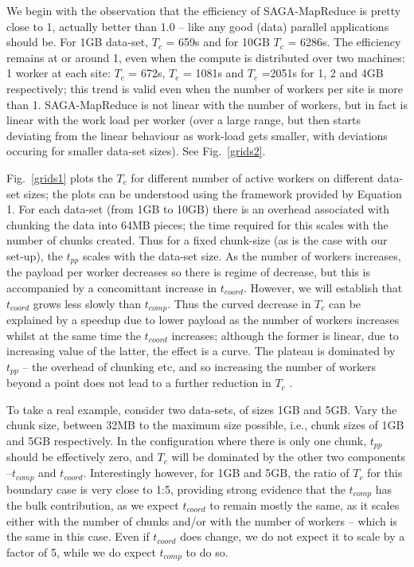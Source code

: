 \documentclass[conference,final]{IEEEtran}
\newcommand{\sagamapreduce }{SAGA-MapReduce }
\newcommand{\tc }{ $T_c$ }
\begin{document}

We begin with the observation that the efficiency of \sagamapreduce is
pretty close to 1, actually better than 1.0 -- like any good (data)
parallel applications should be.  For 1GB data-set, \tc = 659s and for
10GB \tc = 6286s.  The efficiency remains at or around 1, even when
the compute is distributed over two machines: 1 worker at each site:
\tc = 672s, \tc = 1081s and \tc =2051s for 1, 2 and 4GB respectively;
this trend is valid even when the number of workers per site is more
than 1. \sagamapreduce is not linear with the number of workers, but in fact
is linear with the work load per worker (over a large range, but then starts deviating from the linear behaviour as work-load gets smaller, with deviations
occuring for smaller data-set sizes). See Fig.~\ref{grids2}.

Fig.~\ref{grids1} plots the \tc for different number of active workers
on different data-set sizes; the plots can be understood using the
framework provided by Equation 1. For each data-set (from 1GB to 10GB)
there is an overhead associated with chunking the data into 64MB
pieces; the time required for this scales with the number of chunks
created.  Thus for a fixed chunk-size (as is the case with our
set-up), the $t_{pp}$ scales with the data-set size. As the number of
workers increases, the payload per worker decreases so there is regime
of decrease, but this is accompanied by a concomittant increase in
$t_{coord}$. However, we will establish that $t_{coord}$ grows less
slowly than $t_{comp}$. Thus the curved decrease in \tc can be
explained by a speedup due to lower payload as the number of workers
increases whilst at the same time the $t_{coord}$ increases; although
the former is linear, due to increasing value of the latter, the
effect is a curve. The plateau is dominated by $t_{pp}$ -- the
overhead of chunking etc, and so increasing the number of workers
beyond a point does not lead to a further reduction in \tc.

To take a real example, consider two data-sets, of sizes 1GB and 5GB.
Vary the chunk size, between 32MB to the maximum size possible, i.e.,
chunk sizes of 1GB and 5GB respectively. In the configuration where
there is only one chunk, $t_{pp}$ should be effectively zero, and \tc
will be dominated by the other two components --$t_{comp}$ and
$t_{coord}$.  Interestingly however, for 1GB and 5GB, the ratio of \tc
for this boundary case is very close to 1:5, providing strong evidence
that the $t_{comp}$ has the bulk contribution, as we expect
$t_{coord}$ to remain mostly the same, as it scales either with the number 
of chunks and/or with the number of workers -- which is 
the same in this case.  Even if $t_{coord}$ does change, we do not
expect it to scale by a factor of 5, while we do expect $t_{comp}$ to
do so.
\end{document}
